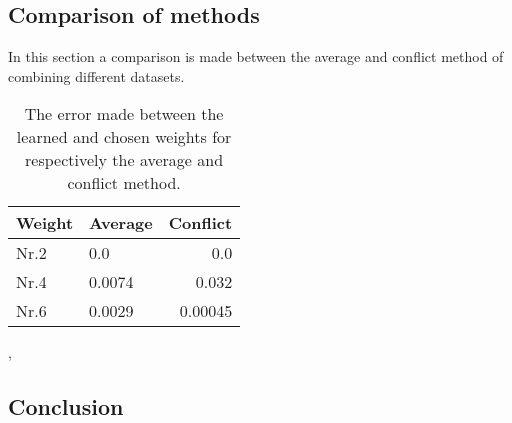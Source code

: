  
 \subsection{Comparison of methods}
 In this section a comparison is made between the average and conflict method of combining different datasets. 
 
 \begin{table}[h!]
 	\centering
 	\begin{tabular}{@{}llr@{}} 
 		Weight    & Average & Conflict\\ \midrule
 		Nr.2      & \hspace{7mm}0.0    & 0.0 \\
 		Nr.4      & \hspace{7mm} 0.0074    & 0.032 \\
 		Nr.6      & \hspace{7mm}0.0029    & 0.00045 \\ \bottomrule
 	\end{tabular}
 	\caption{The error made between the learned and chosen weights for respectively the average and conflict method.}
 	\label{table:error_learned_weights_conflict}
 \end{table}

  , 
 \subsection{Conclusion}





